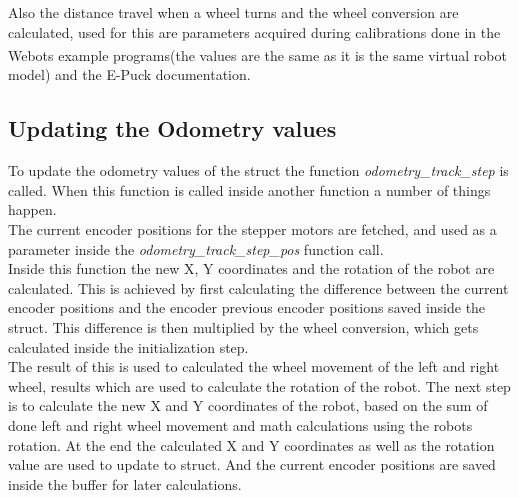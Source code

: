 Also the distance travel when a wheel turns and the wheel conversion are calculated, used for this are parameters acquired during calibrations done in the Webots \textsuperscript{\texttrademark} example programs(the values are the same as it is the same virtual robot model) and the E-Puck documentation. 

\subsection{Updating the Odometry values}
To update the odometry values of the struct the function \textit{odometry\_track\_step} is called.
When this function is called inside another function a number of things happen.\\
The current encoder positions for the stepper motors are fetched, 
and used as a parameter inside the \textit{odometry\_track\_step\_pos} function call. \\
Inside this function the new X, Y coordinates and the rotation of the robot are calculated. This is achieved by first calculating the difference between the current encoder positions and the encoder previous encoder positions saved inside the struct. 
This difference is then multiplied by the wheel conversion, which gets calculated inside the initialization step. \\
The result of this is used to calculated the wheel movement of the left and right wheel, results which are used to calculate the rotation of the robot. 
The next step is to calculate the new X and Y coordinates of the robot, based on the sum of done left and right wheel movement  and math calculations using the robots rotation. 
At the end the calculated X and Y coordinates as well as the rotation value are used to update to struct. And the current encoder positions are saved inside the buffer for later calculations. 

